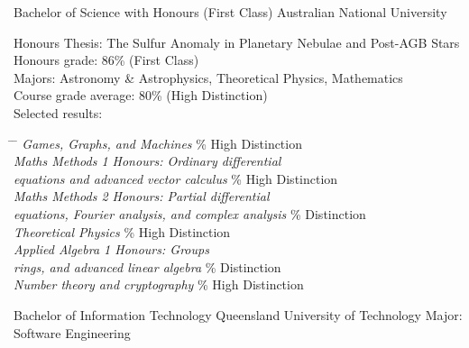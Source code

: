 \documentclass[11pt]{article} %
\begin{document}
{Bachelor of Science with Honours (First Class)}
{}{Australian National University}
{
Honours Thesis: The Sulfur Anomaly in Planetary Nebulae and Post-AGB Stars\\
Honours grade: 86\% (First Class)\\
Majors: Astronomy \& Astrophysics, Theoretical Physics, Mathematics\\
Course grade average: 80\% (High Distinction)\\
Selected results:
\begin{tabbing}\hspace{5pt} \= \hspace{9cm} \= \kill
\>\+\textit{Games, Graphs, and Machines} \% High Distinction\\
\textit{Maths Methods 1 Honours: Ordinary differential}\\\textit{\quad equations and advanced vector calculus} \% High Distinction \\
\textit{Maths Methods 2 Honours: Partial differential}\\\textit{\quad equations, Fourier analysis, and complex analysis} \% Distinction \\
\textit{Theoretical Physics} \% High Distinction \\
\textit{Applied Algebra 1 Honours: Groups}\\\textit{\quad rings, and advanced linear algebra} \% Distinction \\
\textit{Number theory and cryptography} \% High Distinction
\end{tabbing}
}

{Bachelor of Information Technology}
{}{Queensland University of Technology}
{
Major: Software Engineering
}

\end{document}
